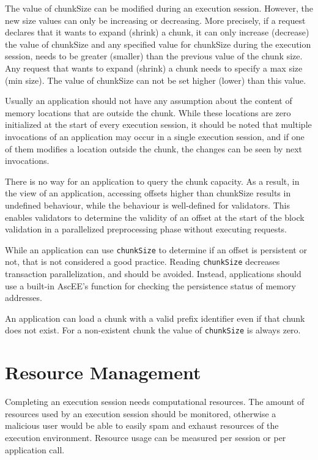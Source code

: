The value of chunkSize can be modified during an execution session. However, the new size values can only be
increasing or decreasing. More precisely, if a request declares that it wants to expand (shrink) a chunk, it can only
increase (decrease) the value of chunkSize and any specified value for chunkSize during the execution session, needs
to be greater (smaller) than the previous value of the chunk size. Any request that wants to expand (shrink) a chunk
needs to specify a max size (min size). The value of chunkSize can not be set higher (lower) than this value.

Usually an application should not have any assumption about the content of memory locations that are outside the chunk.
While these locations are zero initialized at the start of every execution session, it should be noted that multiple
invocations of an application may occur in a single execution session, and if one of them modifies a location outside
the chunk, the changes can be seen by next invocations.

There is no way for an application to query the chunk capacity. As a result, in the view of an application, accessing
offsets higher than chunkSize results in undefined behaviour, while the behaviour is well-defined for validators.
This enables validators to determine the validity of an offset at the start of the block validation in a parallelized
preprocessing phase without executing requests.

While an application can use \texttt{chunkSize} to determine if an offset is persistent or not, that is not
considered a good practice. Reading \texttt{chunkSize} decreases transaction parallelization, and should be avoided.
Instead, applications should use a built-in AscEE's function for checking the persistence status of memory addresses.

An application can load a chunk with a valid prefix identifier even if that chunk does not exist. For a non-existent
chunk the value of \texttt{chunkSize} is always zero.


\section{Resource Management}\label{sec:res-man}

Completing an execution session needs computational resources. The amount of resources used by an execution session
should be monitored, otherwise a malicious user would be able to easily spam and exhaust resources of the execution
environment. Resource usage can be measured per session or per application call.

